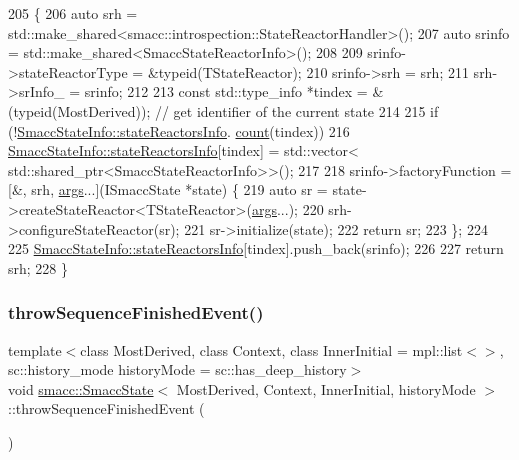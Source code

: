 \begin{DoxyCode}
205     \{
206       \textcolor{keyword}{auto} srh = std::make\_shared<smacc::introspection::StateReactorHandler>();
207       \textcolor{keyword}{auto} srinfo = std::make\_shared<SmaccStateReactorInfo>();
208 
209       srinfo->stateReactorType = &\textcolor{keyword}{typeid}(TStateReactor);
210       srinfo->srh = srh;
211       srh->srInfo\_ = srinfo;
212 
213       \textcolor{keyword}{const} std::type\_info *tindex = &(\textcolor{keyword}{typeid}(MostDerived)); \textcolor{comment}{// get identifier of the current state}
214 
215       \textcolor{keywordflow}{if} (!\hyperlink{classsmacc_1_1introspection_1_1SmaccStateInfo_abd1d6ca5060c87f6bd11fde3e5b2ac4d}{SmaccStateInfo::stateReactorsInfo}.
      \hyperlink{namespacesm__moveit__wine__serve_a063862eb9f05d24ee2307749a218fb17}{count}(tindex))
216         \hyperlink{classsmacc_1_1introspection_1_1SmaccStateInfo_abd1d6ca5060c87f6bd11fde3e5b2ac4d}{SmaccStateInfo::stateReactorsInfo}[tindex] = std::vector<
      std::shared\_ptr<SmaccStateReactorInfo>>();
217 
218       srinfo->factoryFunction = [&, srh, \hyperlink{namespacegenerate__debs_a75f9143e38df82d83b2e8a6f99cae02c}{args}...](ISmaccState *state) \{
219         \textcolor{keyword}{auto} sr = state->createStateReactor<TStateReactor>(\hyperlink{namespacegenerate__debs_a75f9143e38df82d83b2e8a6f99cae02c}{args}...);
220         srh->configureStateReactor(sr);
221         sr->initialize(state);
222         \textcolor{keywordflow}{return} sr;
223       \};
224 
225       \hyperlink{classsmacc_1_1introspection_1_1SmaccStateInfo_abd1d6ca5060c87f6bd11fde3e5b2ac4d}{SmaccStateInfo::stateReactorsInfo}[tindex].push\_back(srinfo);
226 
227       \textcolor{keywordflow}{return} srh;
228     \}
\end{DoxyCode}
\mbox{\label{classsmacc_1_1SmaccState_a49dcfc25824f7e083dd4b999c49ab2b6}} 
\subsubsection{\texorpdfstring{throw\+Sequence\+Finished\+Event()}{throwSequenceFinishedEvent()}}
{\footnotesize\ttfamily template$<$class Most\+Derived, class Context, class Inner\+Initial = mpl\+::list$<$$>$, sc\+::history\+\_\+mode history\+Mode = sc\+::has\+\_\+deep\+\_\+history$>$ \\
void \hyperlink{classsmacc_1_1SmaccState}{smacc\+::\+Smacc\+State}$<$ Most\+Derived, Context, Inner\+Initial, history\+Mode $>$\+::throw\+Sequence\+Finished\+Event (\begin{DoxyParamCaption}{ }\end{DoxyParamCaption})\hspace{0.3cm}{\ttfamily [inline]}}



